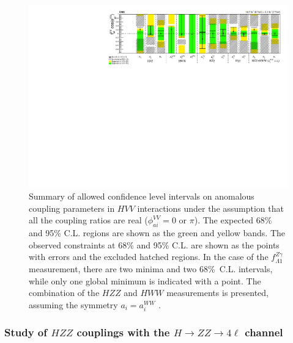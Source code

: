 \begin{figure}
  \centering
    \includegraphics[width=\textwidth]{Spin_Parity/Summary_spin0.pdf}
    \caption[Summary of allowed confidence level intervals on anomalous coupling parameters in $HVV$
interactions under the assumption that all the coupling ratios are real ($\phi_{ai}^{VV}=0$ or $\pi$).
The expected 68\% and 95\% C.L. regions are shown as the green and yellow bands.
The observed constraints at 68\% and 95\% C.L. are shown as the points with errors
and the excluded hatched regions.
In the case of the $f_{\Lambda1}^{Z\gamma}$ measurement, there are two minima and two
68\%~C.L. intervals, while only one global minimum is indicated with a point.
The combination of the  $HZZ$ and $HWW$ measurements is presented,
assuming the symmetry $a_i = a_i^{WW}$.]{
Summary of allowed confidence level intervals on anomalous coupling parameters in $HVV$
interactions under the assumption that all the coupling ratios are real ($\phi_{ai}^{VV}=0$ or $\pi$).
The expected 68\% and 95\% C.L. regions are shown as the green and yellow bands.
The observed constraints at 68\% and 95\% C.L. are shown as the points with errors
and the excluded hatched regions.
In the case of the $f_{\Lambda1}^{Z\gamma}$ measurement, there are two minima and two
68\%~C.L. intervals, while only one global minimum is indicated with a point.
The combination of the  $HZZ$ and $HWW$ measurements is presented,
assuming the symmetry $a_i = a_i^{WW}$ \cite{Khachatryan:2014kca}.
      \label{fig:spin0_summary}}

\end{figure}

\subsubsection{Study of \texorpdfstring{$HZZ$}{HZZ} couplings with the \texorpdfstring{$H\to ZZ\to 4\ell$}{H to ZZ to 4l} channel} \label{sec:Resultspinzerohzz}

